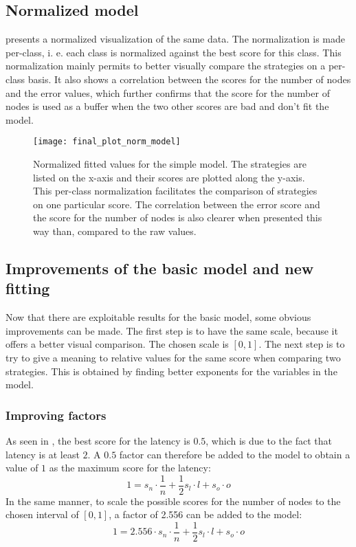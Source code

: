 \FloatBarrier
\subsection{Normalized model}

 presents a normalized visualization of the same
data. The normalization is made per-class, i. e. each class is normalized
against the best score for this class. This normalization mainly permits to
better visually compare the strategies on a per-class basis. It also shows a
correlation between the scores for the number of nodes and the error values,
which further confirms that the score for the number of nodes is used as a
buffer when the two other scores are bad and don't fit the model.


\begin{figure}[h]
    \centering
    \texttt{[image: final\_plot\_norm\_model]}
    \captionsetup{justification=centering}
    \caption{Normalized fitted values for the simple model. The strategies are listed
    on the x-axis and their scores are plotted along the y-axis. 
    This per-class normalization facilitates the comparison of strategies on one
    particular score.
    The correlation between the error score and the score for the number of
    nodes is also clearer when presented this way than, compared to the raw
    values.
    }
    \label{fig:recapTestsPlotNorm}
\end{figure}

\FloatBarrier
\subsection{Improvements of the basic model and new fitting}
Now that there are exploitable results for the basic model, some obvious
improvements can be made. The first step is to have the same scale, because it
offers a better visual comparison. The chosen scale is \([0,1]\). The next step
is to try to give a meaning to relative values for the same score when comparing
two strategies. This is obtained by finding better exponents for the variables
in the model.

\subsubsection{Improving factors}
As seen in , the best score for
the latency is \(0.5\), which is due to the fact that latency is at least \(2\).
A \(0.5\) factor can therefore be added to the model to obtain a value of \(1\)
as the maximum score for the latency: 
\[1 = s_n \cdot \frac{1}{n} + \frac{1}{2} s_l\cdot l + s_o\cdot o\]
In the same manner, to scale the possible scores for the number of nodes to the
chosen interval of \([0,1]\), a factor of 2.556 can be added to the model:
\[1 = 2.556\cdot s_n \cdot \frac{1}{n} + \frac{1}{2} s_l\cdot l + s_o\cdot o\]

